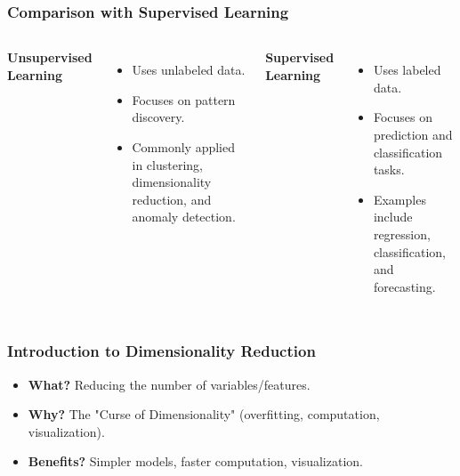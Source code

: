 \documentclass[aspectratio=169]{beamer}
\begin{document}
\begin{frame}
    \frametitle{Comparison with Supervised Learning}
    \begin{columns}[T]
        \textbf{Unsupervised Learning}
        \begin{itemize}
            \item Uses unlabeled data.
            \item Focuses on pattern discovery.
            \item Commonly applied in clustering, dimensionality reduction, and anomaly detection.
        \end{itemize}

        \textbf{Supervised Learning}
        \begin{itemize}
            \item Uses labeled data.
            \item Focuses on prediction and classification tasks.
            \item Examples include regression, classification, and forecasting.
        \end{itemize}
    \end{columns}
\end{frame}

\begin{frame}
\frametitle{Introduction to Dimensionality Reduction}
\begin{itemize}
    \item \textbf{What?}  Reducing the number of variables/features.
    \item \textbf{Why?} The "Curse of Dimensionality" (overfitting, computation, visualization).
    \item \textbf{Benefits?} Simpler models, faster computation, visualization.
\end{itemize}
\end{frame}

\end{document}
